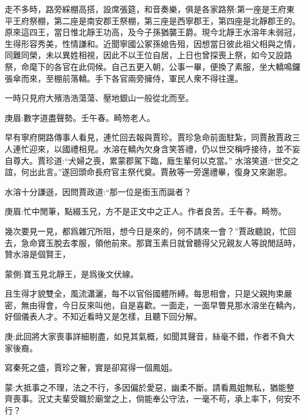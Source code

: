 \begin{parag}
    走不多時，路旁綵棚高搭，設席張筵，和音奏樂，俱是各家路祭:第一座是王府東平王府祭棚，第二座是南安郡王祭棚，第三座是西寧郡王，第四座是北靜郡王的。原來這四王，當日惟北靜王功高，及今子孫猶襲王爵。現今北靜王水溶年未弱冠，生得形容秀美，性情謙和。近聞寧國公冢孫媳告殂，因想當日彼此祖父相與之情，同難同榮，未以異姓相視，因此不以王位自居，上日也曾探喪上祭，如今又設路祭，命麾下的各官在此伺候。自己五更入朝，公事一畢，便換了素服，坐大轎鳴鑼張傘而來，至棚前落轎。手下各官兩旁擁侍，軍民人衆不得往還。
\end{parag}


\begin{parag}
    一時只見府大殯浩浩蕩蕩、壓地銀山一般從北而至。\begin{note}庚眉:數字道盡聲勢。壬午春。畸笏老人。\end{note}早有寧府開路傳事人看見，連忙回去報與賈珍。賈珍急命前面駐紮，同賈赦賈政三人連忙迎來，以國禮相見。水溶在轎內欠身含笑答禮，仍以世交稱呼接待，並不妄自尊大。賈珍道:“犬婦之喪，累蒙郡駕下臨，廕生輩何以克當。” 水溶笑道:“世交之誼，何出此言。”遂回頭命長府官主祭代奠。賈赦等一旁還禮畢，復身又來謝恩。
\end{parag}


\begin{parag}
    水溶十分謙遜，因問賈政道:“那一位是銜玉而誕者？\begin{note}庚眉:忙中閒筆，點綴玉兄，方不是正文中之正人。作者良苦。壬午春。畸笏。\end{note}幾次要見一見，都爲雜冗所阻，想今日是來的，何不請來一會？”賈政聽說，忙回去，急命寶玉脫去孝服，領他前來。那寶玉素日就曾聽得父兄親友人等說閒話時，贊水溶是個賢王，\begin{note}蒙側:寶玉見北靜王，是爲後文伏線。\end{note}且生得才貌雙全，風流瀟灑，每不以官俗國體所縛。每思相會，只是父親拘束嚴密，無由得會，今日反來叫他，自是喜歡。一面走，一面早瞥見那水溶坐在轎內，好個儀表人才。不知近看時又是怎樣，且聽下回分解。
\end{parag}


\begin{parag}
    \begin{note}庚:此回將大家喪事詳細剔盡，如見其氣概，如聞其聲音，絲毫不錯，作者不負大家後裔。\end{note}
\end{parag}


\begin{parag}
    \begin{note}寫秦死之盛，賈珍之奢，實是卻寫得一個鳳姐。\end{note}
\end{parag}


\begin{parag}
    \begin{note}蒙:大抵事之不理，法之不行，多因偏於愛惡，幽柔不斷。請看鳳姐無私，猶能整齊喪事。況丈夫輩受職於廟堂之上，倘能奉公守法，一毫不苟，承上率下，何安不行？\end{note}
\end{parag}